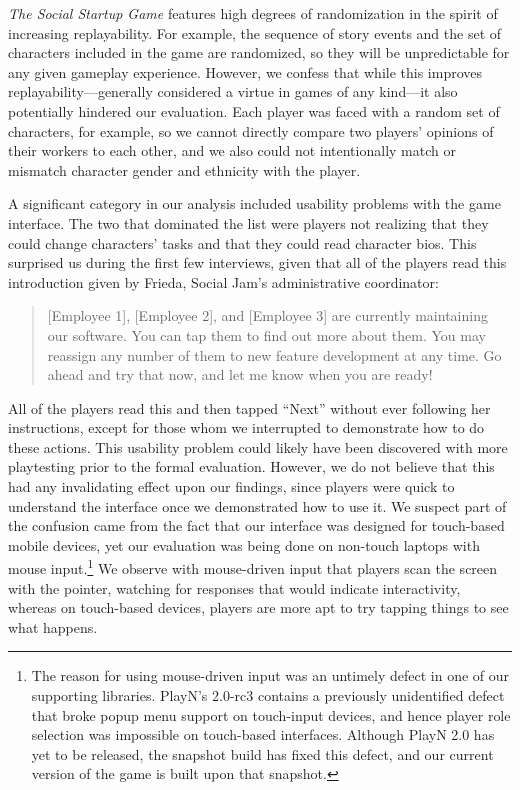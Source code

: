 \documentclass[letterpaper]{article}
\begin{document}
\textit{The Social Startup Game} features high degrees of randomization
in the spirit of increasing replayability. For example, the sequence
of story events and the set of characters included in the game are randomized,
so they will be unpredictable for any given gameplay experience.
However, we confess that while this improves replayability---generally
considered a virtue in games of any kind---it also potentially hindered
our evaluation. Each player was faced with a random set of characters,
for example, so we cannot directly compare two players' opinions of their
workers to each other, and we also could not intentionally match
or mismatch character gender and ethnicity with the player.

A significant category in our analysis included usability problems
with the game interface.
The two that dominated the list were players not realizing that they
could change characters' tasks and that they could
read character bios. This surprised us during the first few interviews,
given that all of the players read this introduction given by Frieda,
Social Jam's administrative coordinator:
\begin{quote} 
  [Employee 1], [Employee 2], and [Employee 3] are currently maintaining our
  software. You can tap them to find out more about them. You may
  reassign any number of them to new feature development at any
  time. Go ahead and try that now, and let me know when you are ready!
\end{quote}
All of the players read this and then tapped ``Next'' without ever following her
instructions, except for those whom we interrupted to demonstrate
how to do these actions.
This usability problem could likely have been discovered with 
more playtesting prior to the formal evaluation. However, we do not
believe that this had any invalidating effect upon our findings,
since players were quick to understand the interface once we
demonstrated how to use it. We suspect part of the confusion came from
the fact that our interface was designed for touch-based mobile devices,
yet our evaluation was being done on non-touch laptops with mouse
input.\footnote{The reason for using mouse-driven input was
 an untimely defect in one of our supporting libraries. 
PlayN's 2.0-rc3 contains a previously unidentified defect 
that broke popup menu support on touch-input devices, and hence player role
selection was impossible on touch-based interfaces. Although PlayN
2.0 has yet to be released, the snapshot build has fixed this defect,
and our current version of the game is built upon that snapshot.}
We observe with mouse-driven input that players scan the screen
with the pointer, watching for responses that would indicate 
interactivity, whereas on touch-based devices, players are more
apt to try tapping things to see what happens.
\end{document}
